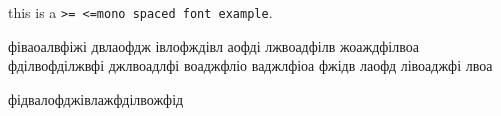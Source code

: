 \documentclass[a4paper,14pt]{extarticle}
\begin{document}





this is a \texttt{>= <=mono spaced font example}.


фіваоалвфіжі двлаофдж івлофждівл аофді
лжвоадфілв жоаждфілвоа фділвофділжвфі джлвоадлфі воаджфліо ваджлфіоа
фжідв лаофд лівоаджфі лвоа


фідвалофджівлажфділвожфід
\end{document}
